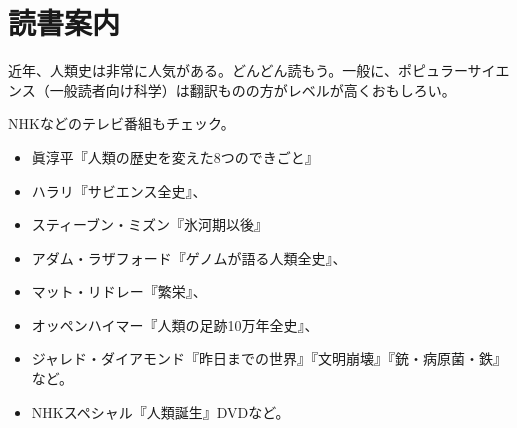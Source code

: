 \documentclass[autodetect-engine,dvipdfmx-if-dvi,ja=standard]{bxjsarticle} \usepackage{mystyle}
\begin{document}
\section{読書案内}

近年、人類史は非常に人気がある。どんどん読もう。一般に、ポピュラーサイエンス（一般読者向け科学）は翻訳ものの方がレベルが高くおもしろい。

NHKなどのテレビ番組もチェック。

\begin{itemize}
\item 眞淳平『人類の歴史を変えた8つのできごと』
\item ハラリ『サビエンス全史』、
\item スティーブン・ミズン『氷河期以後』
  
\item アダム・ラザフォード『ゲノムが語る人類全史』、
\item マット・リドレー『繁栄』、
\item オッペンハイマー『人類の足跡10万年全史』、
\item ジャレド・ダイアモンド『昨日までの世界』『文明崩壊』『銃・病原菌・鉄』など。

\item NHKスペシャル『人類誕生』DVDなど。

\end{itemize}



\ifx\mybook\undefined
{}
%
%
\end{document}

